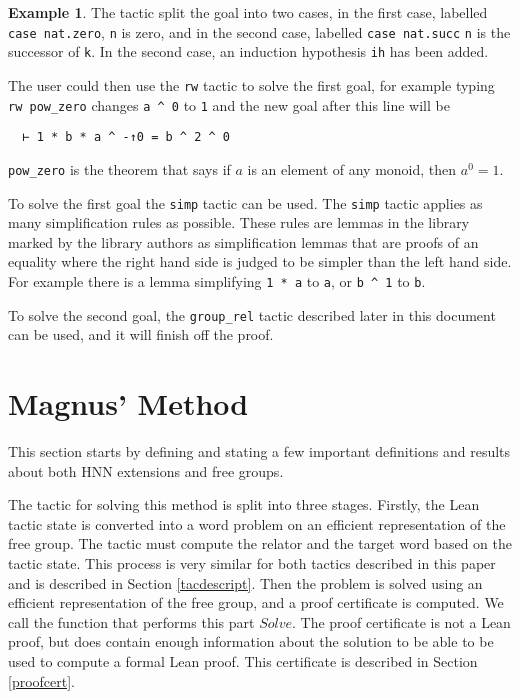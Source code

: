 \documentclass[12pt]{article} %
\theoremstyle{definition}
\theoremstyle{definition}
\theoremstyle{definition}
\theoremstyle{definition}
\theoremstyle{definition}
\theoremstyle{definition}
\newtheorem{exmpl}{Example}[theorem]
\begin{document}
\begin{exmpl}
The tactic split the goal into two cases, in the first case, labelled \lstinline{case nat.zero},
\lstinline{n} is zero, and in the second case, labelled \lstinline{case nat.succ}
\lstinline{n} is the successor of \lstinline{k}. In the second case, an induction
hypothesis \lstinline{ih} has been added.

The user could then use the \lstinline{rw} tactic to solve the first goal,
for example typing \lstinline{rw pow_zero} changes \lstinline{a ^ 0}
to \lstinline{1} and the new goal after this line will be
\begin{lstlisting}
  ⊢ 1 * b * a ^ -↑0 = b ^ 2 ^ 0
\end{lstlisting}

\lstinline{pow_zero} is the theorem that says if $a$ is an
element of any monoid, then $a^0= 1$.

To solve the first goal the \lstinline{simp} tactic can be used.
The \lstinline{simp} tactic applies as many simplification rules as possible.
These rules are lemmas in the library marked by the library authors as simplification
lemmas that are proofs of an equality where the right hand side is judged to be simpler
than the left hand side. For example there is a lemma simplifying \lstinline{1 * a} to
\lstinline{a}, or \lstinline{b ^ 1} to \lstinline{b}.

To solve the second goal, the \lstinline{group_rel} tactic described
later in this document can be used, and it will finish off the proof.

\end{exmpl}

\section{Magnus' Method}\label{magnusmethod}

This section starts by defining and stating a few important definitions and results about both
HNN extensions and free groups.

The tactic for solving this method is split into three stages. Firstly, the Lean tactic state
is converted into a word problem on an efficient representation of the free group. The tactic must
compute the relator and the target word based on the tactic state. This process is very similar
for both tactics described in this paper and is described in Section \ref{tacdescript}. Then
the problem is solved using an efficient representation of the free group, and a proof certificate
is computed. We call the function that performs this part $\textit{Solve}$.
 The proof certificate is not a Lean proof, but does contain enough information
about the solution to be able to be used to compute a formal Lean proof. This certificate is
described in Section \ref{proofcert}.
\end{document}
